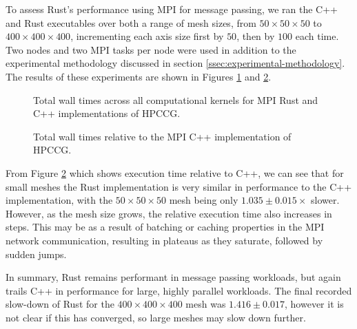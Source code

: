 To assess Rust's performance using MPI for message passing, we ran the C++ and Rust executables over both a range of mesh sizes, from $50 \times 50 \times 50$ to $400 \times 400 \times 400$, incrementing each axis size first by $50$, then by $100$ each time. Two nodes and two MPI tasks per node were used in addition to the experimental methodology discussed in section \ref{ssec:experimental-methodology}. The results of these experiments are shown in Figures \ref{fig:9_mpi_line} and \ref{fig:10_mpi_line_relative}.


\begin{figure}[H]
    \centering
    \fbox{}
    \captionsetup{skip=0pt}
    \caption{Total wall times across all computational kernels for MPI Rust and C++ implementations of \acrshort{HPCCG}.}
    \label{fig:9_mpi_line}
\end{figure}

\begin{figure}[H]
    \centering
    \fbox{}
    \captionsetup{skip=0pt}
    \caption{Total wall times relative to the MPI C++ implementation of \acrshort{HPCCG}.}
    \label{fig:10_mpi_line_relative}
\end{figure}

From Figure \ref{fig:10_mpi_line_relative} which shows execution time relative to C++, we can see that for small meshes the Rust implementation is very similar in performance to the C++ implementation, with the $50 \times 50 \times 50$ mesh being only $1.035 \pm 0.015 \times$ slower. However, as the mesh size grows, the relative execution time also increases in steps. This may be as a result of batching or caching properties in the MPI network communication, resulting in plateaus as they saturate, followed by sudden jumps. 

In summary, Rust remains performant in message passing workloads, but again trails C++ in performance for large, highly parallel workloads. The final recorded slow-down of Rust for the $400 \times 400 \times 400$ mesh was $1.416 \pm 0.017$, however it is not clear if this has converged, so large meshes may slow down further.

